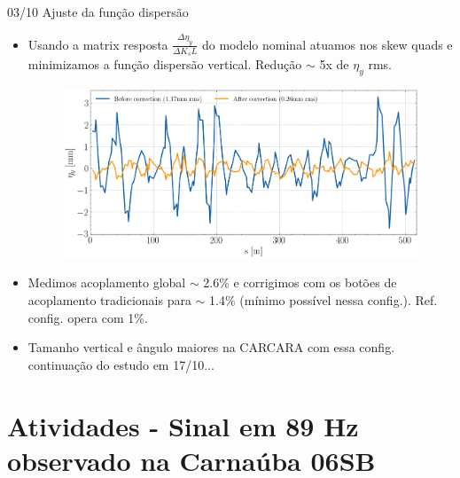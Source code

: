\documentclass{beamer}					%
\begin{document}
\begin{frame}{03/10 Ajuste da função dispersão}
    \begin{itemize}
		\item Usando a matrix resposta $\frac{\Delta \eta_y}{\Delta K_sL}$ do modelo nominal atuamos nos skew quads e minimizamos a função dispersão vertical. Redução $\sim$ 5x de $\eta_y$ rms.
    \begin{figure}[H]
		\centering
        \includegraphics[width=.7\textwidth]{2023-10-06/figures/vertical_dispersion_correction.png}
        \label{fig:figure1}
    \end{figure}
    
        \item Medimos acoplamento global $\sim$ 2.6\% e corrigimos com os botões de acoplamento tradicionais para $\sim$ 1.4\% (mínimo possível nessa config.). Ref. config. opera com 1\%.
        \item Tamanho vertical e ângulo maiores na CARCARA com essa config. continuação do estudo em 17/10...
	\end{itemize}
\end{frame}



\section{Atividades - Sinal em 89 Hz observado na Carnaúba 06SB}
\end{document}
